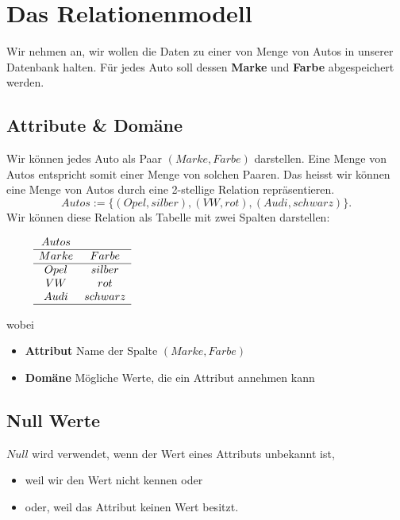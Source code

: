 \documentclass[../DatenbankenFS23.tex]{subfiles}
\begin{document}
\section{Das Relationenmodell}
\begin{problem}
    Wir nehmen an, wir wollen die Daten zu einer von Menge von Autos in
    unserer Datenbank halten.
    Für jedes Auto soll dessen \textbf{Marke} und \textbf{Farbe} abgespeichert werden.
\end{problem}
\subsection{Attribute \& Domäne}
    Wir können jedes Auto als Paar $(Marke, Farbe)$ darstellen.
    Eine Menge von Autos entspricht somit einer Menge von solchen Paaren.
    Das heisst wir können eine Menge von Autos durch eine 2-stellige Relation
    repräsentieren.
    \[Autos := \{(Opel, silber), (VW, rot), (Audi, schwarz)\} .\]
    Wir können diese Relation als Tabelle mit zwei Spalten darstellen:
    \newline
    \begin{figure}[ht]
        \centering
            $\begin{matrix}
                Autos & \\
                \hline
                Marke & Farbe \\
                \hline
                Opel & silber \\
                VW & rot \\
                Audi & schwarz \\
                \hline
            \end{matrix}$
    \end{figure} \newline
    wobei 
    \begin{itemize}
        \item[] \textbf{Attribut} Name der Spalte $(Marke, Farbe)$
        \item[] \textbf{Domäne} Mögliche Werte, die ein Attribut annehmen kann
    \end{itemize}

\subsection{Null Werte}
    $Null$ wird verwendet, wenn der Wert eines Attributs unbekannt ist,
    \begin{itemize}
        \item[] weil wir den Wert nicht kennen oder
        \item[] oder, weil das Attribut keinen Wert besitzt.
    \end{itemize}
\end{document}
